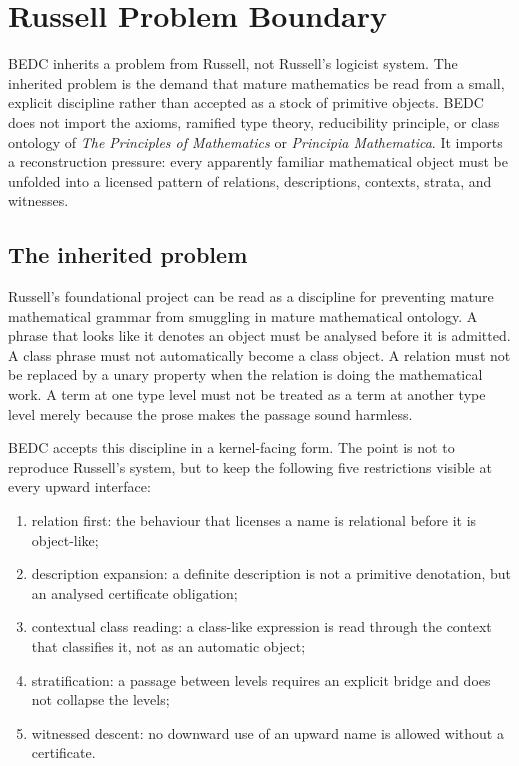 \chapter{Russell Problem Boundary}
\label{ch:visions-russell-problem-boundary}

BEDC inherits a problem from Russell, not Russell's logicist system. The inherited problem is the demand that mature mathematics be read from a small, explicit discipline rather than accepted as a stock of primitive objects. BEDC does not import the axioms, ramified type theory, reducibility principle, or class ontology of \emph{The Principles of Mathematics} or \emph{Principia Mathematica}. It imports a reconstruction pressure: every apparently familiar mathematical object must be unfolded into a licensed pattern of relations, descriptions, contexts, strata, and witnesses.

\section{The inherited problem}
\label{sec:russell-problem-inherited}

Russell's foundational project can be read as a discipline for preventing mature mathematical grammar from smuggling in mature mathematical ontology. A phrase that looks like it denotes an object must be analysed before it is admitted. A class phrase must not automatically become a class object. A relation must not be replaced by a unary property when the relation is doing the mathematical work. A term at one type level must not be treated as a term at another type level merely because the prose makes the passage sound harmless.

BEDC accepts this discipline in a kernel-facing form. The point is not to reproduce Russell's system, but to keep the following five restrictions visible at every upward interface:

\begin{enumerate}
  \item relation first: the behaviour that licenses a name is relational before it is object-like;
  \item description expansion: a definite description is not a primitive denotation, but an analysed certificate obligation;
  \item contextual class reading: a class-like expression is read through the context that classifies it, not as an automatic object;
  \item stratification: a passage between levels requires an explicit bridge and does not collapse the levels;
  \item witnessed descent: no downward use of an upward name is allowed without a certificate.
\end{enumerate}


